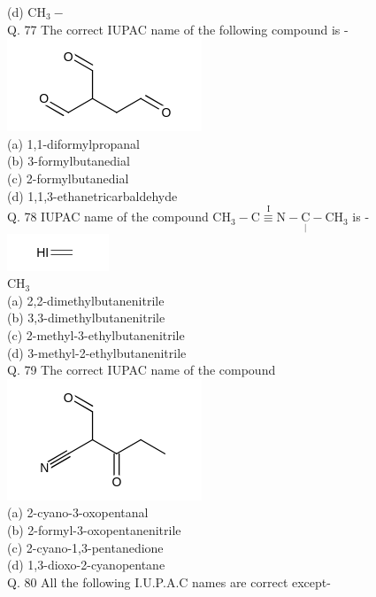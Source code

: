 \documentclass[10pt]{article}
\begin{document}
(d) $\mathrm{CH}_{3}-$\\
Q. 77 The correct IUPAC name of the following compound is -\\
\includegraphics{smile-06e595fa8dda363510ca8ce28a114a008f8dcfb3}\\
(a) 1,1-diformylpropanal\\
(b) 3-formylbutanedial\\
(c) 2-formylbutanedial\\
(d) 1,1,3-ethanetricarbaldehyde\\
Q. 78 IUPAC name of the compound $\mathrm{CH}_{3}-\stackrel{\mathrm{I}}{\mathrm{C} \equiv \mathrm{N}}-\underset{\mid}{\mathrm{C}}-\mathrm{CH}_{3}$ is -\\
\includegraphics{smile-9ab26ad864c71bdde4706cd8a8ff4505c2873d5c}\\
$\mathrm{CH}_{3}$\\
(a) 2,2-dimethylbutanenitrile\\
(b) 3,3-dimethylbutanenitrile\\
(c) 2-methyl-3-ethylbutanenitrile\\
(d) 3-methyl-2-ethylbutanenitrile\\
Q. 79 The correct IUPAC name of the compound\\
\includegraphics{smile-d87ba862f5b3274ce8f4e04248cea07958492a31}\\
(a) 2-cyano-3-oxopentanal\\
(b) 2-formyl-3-oxopentanenitrile\\
(c) 2-cyano-1,3-pentanedione\\
(d) 1,3-dioxo-2-cyanopentane\\
Q. 80 All the following I.U.P.A.C names are correct except-\\
\end{document}
